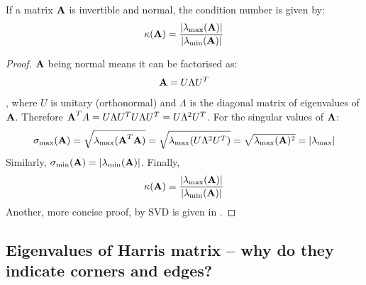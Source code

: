 \documentclass[a4paper]{article}
\begin{document}
\begin{corollary}
	If a matrix $\textbf{A}$ is invertible and normal, the condition number is given by:
	\begin{equation*}
		\kappa(\textbf{A}) = \frac{\left|\lambda_{\max}(\textbf{A})\right|}{\left|\lambda_{\min}(\textbf{A})\right|}	
	\end{equation*}
\end{corollary}
\begin{proof}
	$\textbf{A}$ being normal means it can be factorised as:
	\begin{equation*}
		\textbf{A} = U \Lambda U^T
	\end{equation*}
	, where $U$ is unitary (orthonormal) and $\Lambda$ is the diagonal matrix of eigenvalues of $\textbf{A}$. Therefore $\textbf{A}^TA = U \Lambda U^T U \Lambda U^T = U \Lambda^2 U^T$. For the singular values of $\textbf{A}$:
\begin{equation*}
	\sigma_{\max}(\textbf{A}) = \sqrt{\lambda_{\max}(\textbf{A}^T \textbf{A})} = \sqrt{\lambda_	{\max}(U \Lambda^2 U^T)} = \sqrt{\lambda_{\max}(\textbf{A})^2} = \left| \lambda_{\max} \right|
\end{equation*}
	Similarly, $\sigma_{\min}(\textbf{A}) = \left| \lambda_{\min}(\textbf{A})\right|$. Finally,
	\begin{equation*}
		\kappa(\textbf{A}) = \frac{\left| \lambda_{\max}(\textbf{A})\right|}{\left| \lambda_{\min}(\textbf{A})\right|}		
	\end{equation*}
	Another, more concise proof, by SVD is given in \cite{stackratioproof}.
\end{proof}





\newpage
\subsection{Eigenvalues of Harris matrix -- why do they indicate corners and edges?}
\label{app:harris_eigenvalues}
\end{document}
